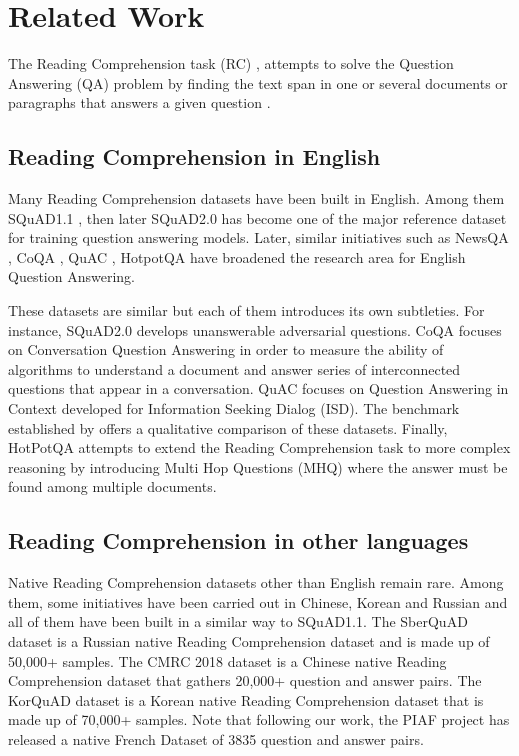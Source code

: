 \documentclass{article}
\begin{document}
\section{Related Work}
\label{section:related_work}
The Reading Comprehension task (RC) \citep{richardson-etal-2013-mctest}, \citep{rajpurkar-etal-2016-squad} attempts to solve the Question Answering (QA) problem by finding the text span in one or several documents or paragraphs that answers a given question \citep{nlpprogress}.

\subsection{Reading Comprehension in English}

Many Reading Comprehension datasets have been built in English.
Among them SQuAD1.1 \citep{rajpurkar-etal-2016-squad}, then later SQuAD2.0 \citep{rajpurkar-squad-v2} has become one of the major reference dataset for training question answering models.
Later, similar initiatives such as NewsQA \citep{NewsQA}, CoQA \citep{CoQA}, QuAC \citep{quac}, HotpotQA \citep{yang2018hotpotqa} have broadened the research area for English Question Answering. 

These datasets are similar but each of them introduces its own subtleties.
For instance, SQuAD2.0 \citep{rajpurkar-squad-v2} develops unanswerable adversarial questions.
CoQA \citep{CoQA} focuses on Conversation Question Answering in order to measure the ability of algorithms to understand a document and answer series of interconnected questions that appear in a conversation.
QuAC \citep{quac} focuses on Question Answering in Context developed for Information Seeking Dialog (ISD).
The benchmark established by \citep{qa-benchmark} offers a qualitative comparison of these datasets.
Finally, HotPotQA\citep{yang2018hotpotqa} attempts to extend the Reading Comprehension task to more complex reasoning by introducing Multi Hop Questions (MHQ) where the answer must be found among multiple documents.

\subsection{Reading Comprehension in other languages}

Native Reading Comprehension datasets other than English remain rare.
Among them, some initiatives have been carried out in Chinese, Korean and Russian and all of them have been built in a similar way to SQuAD1.1.
The SberQuAD dataset \citep{efimov2019sberquad} is a Russian native Reading Comprehension dataset and is made up of 50,000+ samples.
The CMRC 2018 \citep{cui-etal-2019-span} dataset is a Chinese native Reading Comprehension dataset that gathers 20,000+ question and answer pairs.
The KorQuAD dataset \citep{lim2019korquad10} is a Korean native Reading Comprehension dataset that is made up of 70,000+ samples.
Note that following our work, the PIAF project \citep{piaf} has released a native French Dataset of 3835 question and answer pairs.
\end{document}
